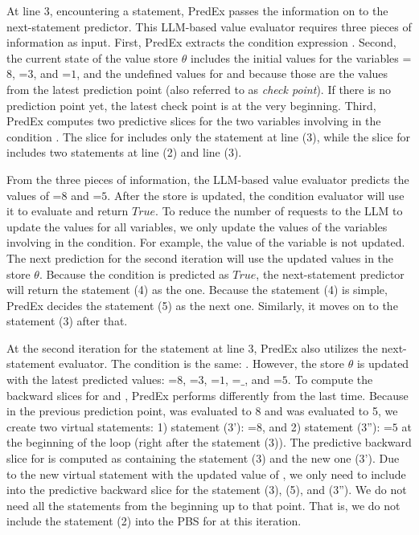 At line 3, encountering a  statement, PredEx passes the
information on to the next-statement predictor. This LLM-based value
evaluator requires three pieces of information as
input. First, PredEx extracts the condition expression . Second, the current state of the value store $\theta$ includes the
initial values for the variables =$8$, =$3$, and =$1$, and
the undefined values for  and  because those are the
values from the latest prediction point (also referred to as {\em
  check point}). If there is no prediction point yet, the latest check
point is at the very beginning. Third, PredEx computes two predictive
slices for the two variables involving in the condition
. The slice for  includes only the statement at line
(3), while the slice for  includes two statements at line (2)
and line (3).

From the three pieces of information, the LLM-based value evaluator
predicts the values of =$8$ and =$5$. After the store is
updated, the condition evaluator
will use it to evaluate  and return $True$. To reduce
the number of requests to the LLM to update the values for all
variables, we only update the values of the variables involving in the
condition. For example, the value of the variable  is not
updated. The next prediction for the second iteration
will use the updated values in the store $\theta$. Because the
condition is predicted as $True$, the next-statement predictor will
return the statement (4) as the one.
%
Because the statement (4) is simple, PredEx decides the
statement (5) as the next one. Similarly, it moves on to
the statement (3) after that.



At the second iteration for the  statement at line 3,
PredEx also utilizes the next-statement evaluator. The condition is
the same: . However, the store $\theta$ is updated with
the latest predicted values: =$8$, =$3$, =$1$,
=$\_$, and =$5$. To compute the backward
slices for  and , PredEx performs differently
from the last time. Because in the previous prediction point, 
was evaluated to 8 and  was evaluated to 5, we create two
virtual statements: 1) statement (3'): =$8$, and 2) statement
(3''): =$5$ at the beginning of the loop (right after the
statement (3)). The predictive backward slice for  is computed
as containing the statement (3) and the new one (3'). Due to the new
virtual statement with the updated value of , we only need
to include into the predictive backward slice for  the
statement (3), (5), and (3''). We do not need all the statements from
the beginning up to that point. That is, we do not include the
statement (2) into the PBS for  at this iteration.

